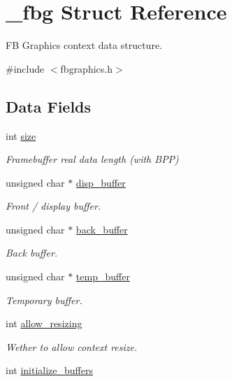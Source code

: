 \hypertarget{struct__fbg}{}\section{\+\_\+fbg Struct Reference}
\label{struct__fbg}


FB Graphics context data structure.  




{\ttfamily \#include $<$fbgraphics.\+h$>$}

\subsection*{Data Fields}
\begin{DoxyCompactItemize}
\item 
int \hyperlink{struct__fbg_a84fb220d4804cba22176997898e75b73}{size}
\begin{DoxyCompactList}\small\item\em Framebuffer real data length (with B\+PP) \end{DoxyCompactList}\item 
unsigned char $\ast$ \hyperlink{struct__fbg_aa20614c94c7235bc5bc105b6e71e1be8}{disp\+\_\+buffer}
\begin{DoxyCompactList}\small\item\em Front / display buffer. \end{DoxyCompactList}\item 
unsigned char $\ast$ \hyperlink{struct__fbg_a907e7fc97965b972c17114c885e53735}{back\+\_\+buffer}
\begin{DoxyCompactList}\small\item\em Back buffer. \end{DoxyCompactList}\item 
unsigned char $\ast$ \hyperlink{struct__fbg_a0463af9bf583afe770b822c1fbb9a24d}{temp\+\_\+buffer}
\begin{DoxyCompactList}\small\item\em Temporary buffer. \end{DoxyCompactList}\item 
int \hyperlink{struct__fbg_ad7796d799a4ad67405101b8548d99ad8}{allow\+\_\+resizing}
\begin{DoxyCompactList}\small\item\em Wether to allow context resize. \end{DoxyCompactList}\item 
int \hyperlink{struct__fbg_ac9a25b7b2700bee151d8f9dc3e586487}{initialize\+\_\+buffers}

\end{DoxyCompactItemize}
